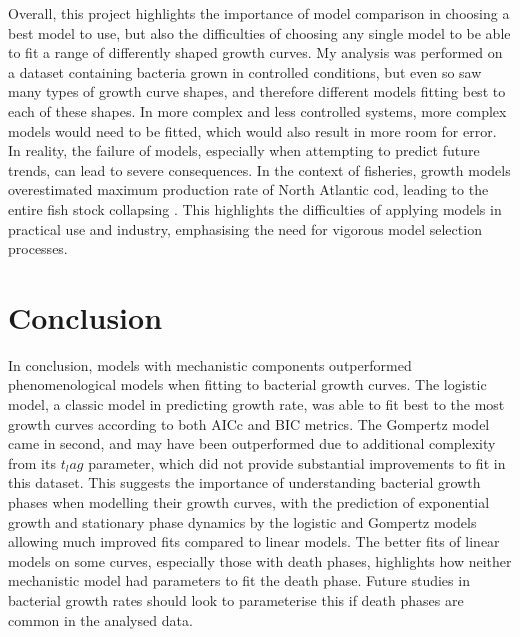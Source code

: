 \documentclass[11pt, letterpaper]{article}
\begin{document}
\noindent Overall, this project highlights the importance of model comparison in choosing a best model to use, but also the difficulties of choosing any single model to be able to fit a range of differently shaped growth curves. My analysis was performed on a dataset containing bacteria grown in controlled conditions, but even so saw many types of growth curve shapes, and therefore different models fitting best to each of these shapes. In more complex and less controlled systems, more complex models would need to be fitted, which would also result in more room for error. In reality, the failure of models, especially when attempting to predict future trends, can lead to severe consequences. In the context of fisheries, growth models overestimated maximum production rate of North Atlantic cod, leading to the entire fish stock collapsing \citep{cod_1996}. This highlights the difficulties of applying models in practical use and industry, emphasising the need for vigorous model selection processes.

\section{Conclusion}
In conclusion, models with mechanistic components outperformed phenomenological models when fitting to bacterial growth curves. The logistic model, a classic model in predicting growth rate, was able to fit best to the most growth curves according to both AICc and BIC metrics. The Gompertz model came in second, and may have been outperformed due to additional complexity from its $t_lag$ parameter, which did not provide substantial improvements to fit in this dataset. This suggests the importance of understanding bacterial growth phases when modelling their growth curves, with the prediction of exponential growth and stationary phase dynamics by the logistic and Gompertz models allowing much improved fits compared to linear models. The better fits of linear models on some curves, especially those with death phases, highlights how neither mechanistic model had parameters to fit the death phase. Future studies in bacterial growth rates should look to parameterise this if death phases are common in the analysed data.



\end{document}
